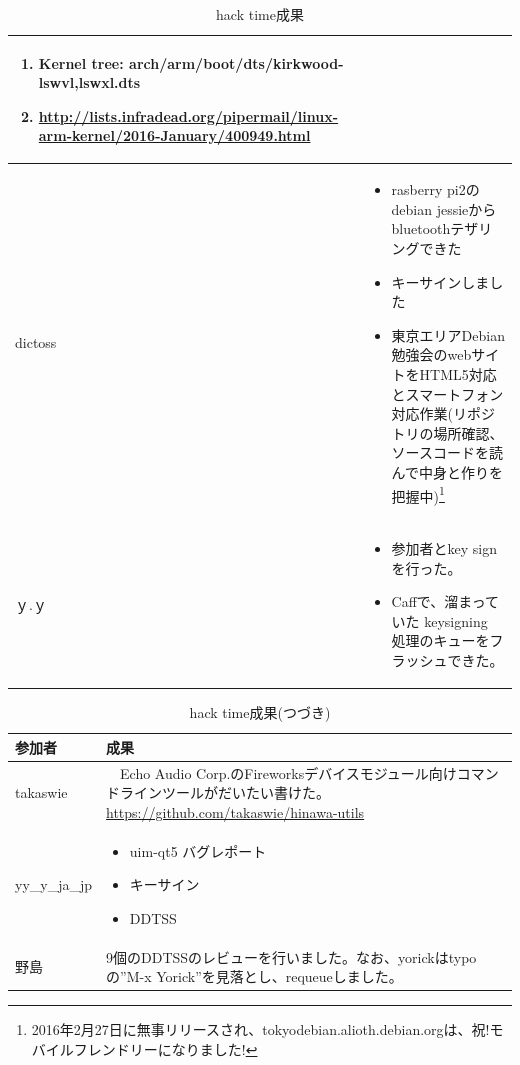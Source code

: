 \documentclass[mingoth,a4paper]{jsarticle}
\begin{document}
\begin{table}
\begin{center}
\begin{tabular}{|l|p{15cm}|}
\begin{itemize}
\begin{enumerate}
    \item Kernel tree: arch/arm/boot/dts/kirkwood-{lswvl,lswxl}.dts
    \item \url{http://lists.infradead.org/pipermail/linux-arm-kernel/2016-January/400949.html}
    \end{enumerate}
  \end{itemize} \\ \hline
dictoss &   \begin{itemize}
  \item rasberry pi2のdebian jessieからbluetoothテザリングできた
  \item キーサインしました
  \item 東京エリアDebian勉強会のwebサイトをHTML5対応とスマートフォン対応作業(リポジトリの場所確認、ソースコードを読んで中身と作りを把握中)\footnote{2016年2月27日に無事リリースされ、tokyodebian.alioth.debian.orgは、祝!モバイルフレンドリーになりました!}
  \end{itemize} \\ \hline
ｙ.ｙ &
  \begin{itemize}
   \item 参加者とkey signを行った。
   \item Caffで、溜まっていた keysigning 処理のキューをフラッシュできた。
  \end{itemize} \\ \hline
  \end{tabular}
\end{center}
\caption{hack time成果}
\end{table}

\begin{table}
\begin{center}
  \begin{tabular}{|l|p{15cm}|}
    \hline
参加者 & 成果 \\ \hline \hline
takaswie & 
　Echo Audio Corp.のFireworksデバイスモジュール向けコマンドラインツールがだいたい書けた。
\url{https://github.com/takaswie/hinawa-utils} \\ \hline
yy\_y\_ja\_jp & 
  \begin{itemize}
  \item uim-qt5 バグレポート
  \item キーサイン
  \item DDTSS
  \end{itemize} \\ \hline
野島 &9個のDDTSSのレビューを行いました。なお、yorickはtypoの''M-x Yorick''を見落とし、requeueしました。\\ \hline
  \end{tabular}
\end{center}
\caption{hack time成果(つづき)}
\end{table}
\end{document}
